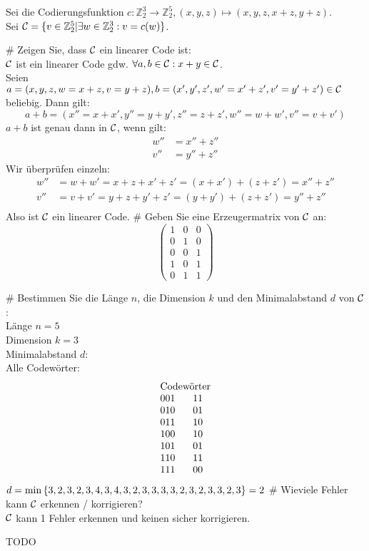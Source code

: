 Sei die Codierungsfunktion $c: \mathbb{Z}^3_2 \rightarrow \mathbb{Z}^5_2 , (x,y,z) \mapsto (x,y,z,x+z,y+z)$.\\
Sei $\mathcal{C} = \lbrace v \in \mathbb{Z}^5_2 | \exists w \in \mathbb{Z}^3_2: v = c(w) \rbrace$.
\begin{myList}
# Zeigen Sie, dass $\mathcal{C}$ ein linearer Code ist:\\
$\mathcal{C}$ ist ein linearer Code gdw. $\forall a, b\in\mathcal{C}: x+y\in\mathcal{C}$.\\
Seien $a = (x, y, z, w=x+z, v=y+z), b=(x', y', z', w'=x'+z', v'=y'+z')\in\mathcal{C}$ beliebig. Dann gilt:
$$a+b = (x'' = x+x', y'' = y+y', z'' = z+z', w'' = w+w', v'' = v+v')$$
$a+b$ ist genau dann in $\mathcal{C}$, wenn gilt:
\begin{align*}
w'' &= x''+z''\\
v'' &= y''+z''
\end{align*}
Wir überprüfen einzeln:
\begin{align*}
w'' &= w+w' = x+z+x'+z'=(x+x')+(z+z') = x'' + z''\\
v'' &= v+v' = y+z+y'+z'=(y+y')+(z+z') = y'' + z''\\
\end{align*}
Also ist $\mathcal{C}$ ein linearer Code.
# Geben Sie eine Erzeugermatrix von $\mathcal{C}$ an:\\
$$\begin{pmatrix}
1 & 0 & 0\\
0 & 1 & 0\\
0 & 0 & 1\\
1 & 0 & 1\\
0 & 1 & 1
\end{pmatrix}$$

#
Bestimmen Sie die Länge $n$, die Dimension $k$ und den Minimalabstand $d$ von $\mathcal{C}$:\\
Länge $n = 5$\\
Dimension $k = 3$\\
Minimalabstand $d$:\\
Alle Codewörter:
$$\begin{array}{cc}
\multicolumn{2}{c}{\text{Codewörter}}\\
001 & 11 \\
010 & 01 \\
011 & 10 \\
100 & 10 \\
101 & 01 \\
110 & 11 \\
111 & 00 \\
\end{array}$$
$d=\min\left\lbrace 3, 2, 3, 2, 3, 4, 3, 4, 3, 2, 3, 3, 3, 3, 2, 3, 2, 3, 3, 2, 3 \right\rbrace = 2$ 
# Wieviele Fehler kann $\mathcal{C}$ erkennen / korrigieren?\\
$\mathcal{C}$ kann 1 Fehler erkennen und keinen sicher korrigieren.

TODO
\end{myList}

